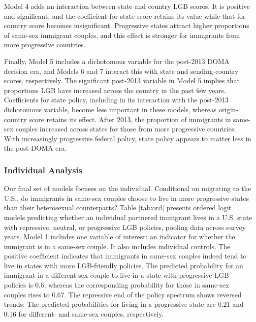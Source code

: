 \documentclass[
  12pt,
]{article}
\begin{document}
Model 4 adds an interaction between state and country LGB scores. It is positive and significant, and the coefficient for state score retains its value while that for country score becomes insignificant. Progressive states attract higher proportions of same-sex immigrant couples, and this effect is stronger for immigrants from more progressive countries.

Finally, Model 5 includes a dichotomous variable for the post-2013 DOMA decision era, and Models 6 and 7 interact this with state and sending-country scores, respectively. The significant post-2013 variable in Model 5 implies that proportions LGB have increased across the country in the past few years. Coefficients for state policy, including in its interaction with the post-2013 dichotomous variable, become less important in these models, whereas origin-country score retains its effect. After 2013, the proportion of immigrants in same-sex couples increased across states for those from more progressive countries. With increasingly progressive federal policy, state policy appears to matter less in the post-DOMA era.

\hypertarget{individual-analysis}{%
\subsubsection{Individual Analysis}\label{individual-analysis}}

Our final set of models focuses on the individual. Conditional on migrating to the U.S., do immigrants in same-sex couples choose to live in more progressive states than their heterosexual counterparts? Table \ref{tab:ord} presents ordered logit models predicting whether an individual partnered immigrant lives in a U.S. state with repressive, neutral, or progressive LGB policies, pooling data across survey years. Model 1 includes one variable of interest: an indicator for whether the immigrant is in a same-sex couple. It also includes individual controls. The positive coefficient indicates that immigrants in same-sex couples indeed tend to live in states with more LGB-friendly policies. The predicted probability for an immigrant in a different-sex couple to live in a state with progressive LGB policies is 0.6, whereas the corresponding probability for those in same-sex couples rises to 0.67. The repressive end of the policy spectrum shows reversed trends: The predicted probabilities for living in a progressive state are 0.21 and 0.16 for different- and same-sex couples, respectively.
\end{document}
